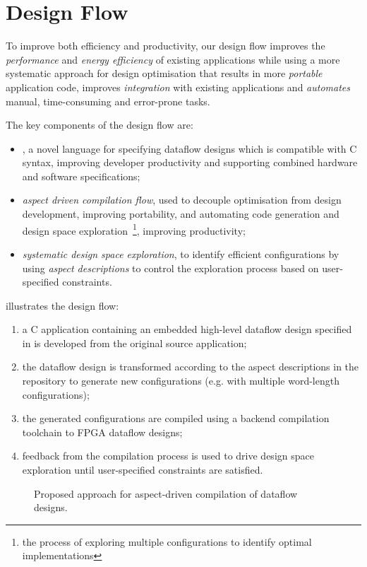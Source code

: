 \section{Design Flow}
\label{sec:design-flow}

To improve both efficiency and productivity, our design flow improves
the \emph{performance} and \emph{energy efficiency} of existing
applications while using a more systematic approach for design
optimisation that results in more \emph{portable} application code,
improves \emph{integration} with existing applications and
\emph{automates} manual, time-consuming and error-prone tasks.

The key components of the design flow are:
\begin{itemize}
\item \emph{\FAST{}}, a novel language for specifying dataflow designs
  which is compatible with C syntax, improving developer productivity
  and supporting combined hardware and software specifications;

\item \emph{aspect driven compilation flow}, used to decouple
  optimisation from design development, improving portability, and
  automating code generation and design space
  exploration~\footnote{the process of exploring multiple
    configurations to identify optimal implementations}, improving
  productivity;

\item \emph{systematic design space exploration}, to identify
  efficient configurations by using \emph{aspect descriptions} to
  control the exploration process based on user-specified constraints.
\end{itemize}

 illustrates the design flow:
\begin{enumerate}
\item a C application containing an embedded high-level dataflow
  design specified in \FAST{} is developed from the original source
  application;
\item the dataflow design is transformed according to the aspect
  descriptions in the repository to generate new configurations
  (e.g. with multiple word-length configurations);
\item the generated configurations are compiled using a backend
  compilation toolchain to FPGA dataflow designs;
\item feedback from the compilation process is used to drive design
  space exploration until user-specified constraints are satisfied.
\end{enumerate}

\begin{figure}[!ht]
  \centering
  \def\svgwidth{0.9\textwidth}
  
  \caption{Proposed approach for aspect-driven compilation of dataflow
   designs.}
  \label{fig:design-flow}
\end{figure}